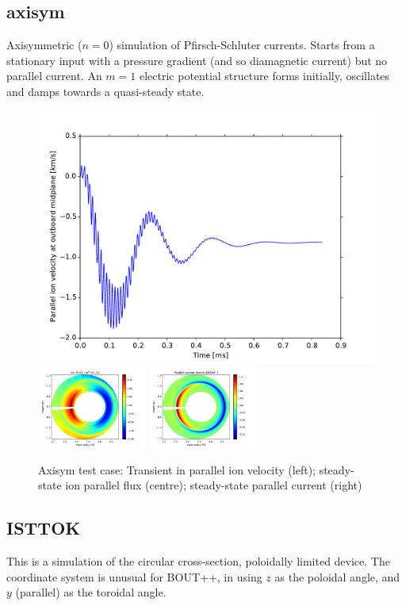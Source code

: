 \documentclass[12pt,a4paper]{article}
\begin{document}
\subsection{axisym}

Axisymmetric ($n=0$) simulation of Pfirsch-Schluter currents. Starts from a stationary input with
a pressure gradient (and so diamagnetic current) but no parallel current. An $m=1$ electric potential
structure forms initially, oscillates and damps towards a quasi-steady state.

\begin{figure}[h]
\centering
\includegraphics[width=0.32\columnwidth]{figs/axisym-vi-time.pdf}
\includegraphics[width=0.32\textwidth]{figs/axisym-ion-flux.pdf}
\includegraphics[width=0.32\textwidth]{figs/axisym-jpar.pdf}
\caption{Axisym test case: Transient in parallel ion velocity (left); steady-state ion parallel flux (centre); steady-state parallel current (right)}
\label{fig:axisym}
\end{figure}






\subsection{ISTTOK}

This is a simulation of the circular cross-section, poloidally limited device. The coordinate system
is unusual for BOUT++, in using $z$ as the poloidal angle, and $y$ (parallel) as the toroidal angle.
\end{document}
